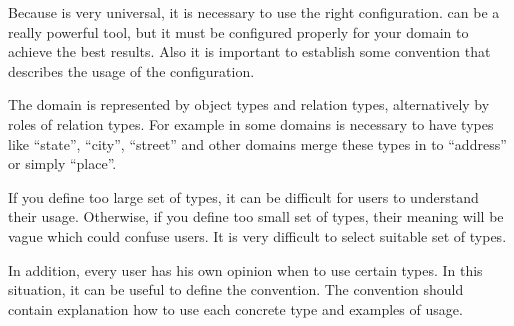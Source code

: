 
Because \textan{} is very universal, it is necessary to use the right
configuration. \textan{} can be a really powerful tool, but it must be
configured properly for your domain to achieve the best results. Also it is
important to establish some convention that describes the usage of the
configuration.

The domain is represented by object types and relation types, alternatively by
roles of relation types. For example in some domains is necessary to have types
like ``state'', ``city'', ``street'' and other domains merge these types in to
``address'' or simply ``place''.

If you define too large set of types, it can be difficult for users to understand
their usage. Otherwise, if you define too small set of types, their meaning will
be vague which could confuse users. It is very difficult to select suitable set
of types.

In addition, every user has his own opinion when to use certain types. In this
situation, it can be useful to define the convention. The convention should
contain explanation how to use each concrete type and examples of usage.
